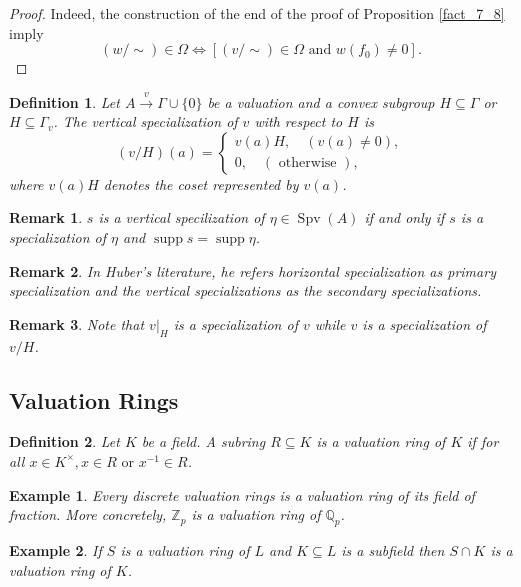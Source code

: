 \documentclass[8pt]{article}
\numberwithin{equation}{section}
\newtheorem{definition}{Definition}[subsection]
\newtheorem{remark}{Remark}[subsection]
\newtheorem{example}{Example}[subsection]
\DeclareMathOperator{\supp}{supp}
\DeclareMathOperator{\Spv}{Spv}
\newcommand{\Z}[0]{\mathbb{Z}}
\newcommand{\Q}[0]{\mathbb{Q}}
\newcommand{\tand}[0]{\text{ and }}
\newcommand{\tor}[0]{\text{ or }}
\newcommand{\otherwise}[0]{\text{ otherwise }}
\begin{document}
\begin{proof}
    Indeed, the construction of the end of the proof of Proposition \ref{fact_7_8} imply 
    \begin{equation*}
        (w/\sim)\in\Omega\iff[(v/\sim)\in\Omega\tand w(f_0)\not=0].
    \end{equation*}
\end{proof}

\begin{definition}
    Let $A\stackrel{v}{\to}\Gamma\cup\{0\}$ be a valuation and a convex subgroup $H\subseteq \Gamma$ or $H\subseteq\Gamma_v$. The vertical specialization of $v$ with respect to $H$ is
    \begin{equation*}
        (v/H)(a)=\begin{cases}
            v(a)H, \quad(v(a)\not=0),\\
            0,\quad(\otherwise),
        \end{cases}
    \end{equation*}
    where $v(a)H$ denotes the coset represented by $v(a)$.
\end{definition}

\begin{remark}
    $s$ is a vertical specilization of $\eta\in\Spv(A)$ if and only if $s$ is a specialization of $\eta$ and $\supp s = \supp \eta$. 
\end{remark}
\begin{remark}
    In Huber's literature, he refers horizontal specialization as primary specialization and the vertical specializations as the secondary specializations.
\end{remark}

\begin{remark}
    Note that $v|_H$ is a specialization of $v$ while $v$ is a specialization of $v/H$.
\end{remark}

\subsection{Valuation Rings}

\begin{definition}
    Let $K$ be a field. A subring $R\subseteq K$ is a valuation ring of $K$ if for all $x\in K^\times, x\in R\tor x^{-1}\in R$.
\end{definition}

\begin{example}
    Every discrete valuation rings is a valuation ring of its field of fraction. More concretely, $\Z_p$ is a valuation ring of $\Q_p$. 
\end{example}
\begin{example}
    If $S$ is a valuation ring of $L$ and $K\subseteq L$ is a subfield then $S\cap K$ is a valuation ring of $K$.
\end{example}
\end{document}
